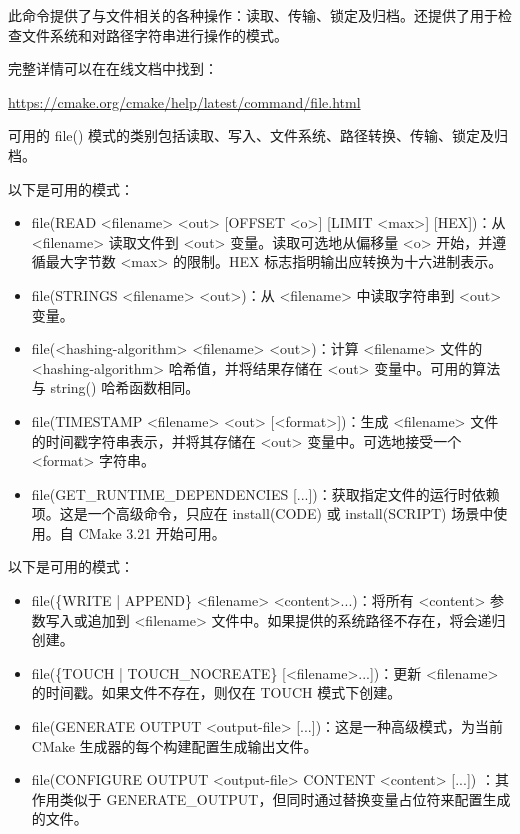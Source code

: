 
此命令提供了与文件相关的各种操作：读取、传输、锁定及归档。还提供了用于检查文件系统和对路径字符串进行操作的模式。

完整详情可以在在线文档中找到：

\url{https://cmake.org/cmake/help/latest/command/file.html}

可用的 file() 模式的类别包括读取、写入、文件系统、路径转换、传输、锁定及归档。


以下是可用的模式：

\begin{itemize}
\item
file(READ <filename> <out> [OFFSET <o>] [LIMIT <max>] [HEX])：从 <filename> 读取文件到 <out> 变量。读取可选地从偏移量 <o> 开始，并遵循最大字节数 <max> 的限制。HEX 标志指明输出应转换为十六进制表示。

\item
file(STRINGS <filename> <out>)：从 <filename> 中读取字符串到 <out> 变量。

\item
file(<hashing-algorithm> <filename> <out>)：计算 <filename> 文件的 <hashing-algorithm> 哈希值，并将结果存储在 <out> 变量中。可用的算法与 string() 哈希函数相同。

\item
file(TIMESTAMP <filename> <out> [<format>])：生成 <filename> 文件的时间戳字符串表示，并将其存储在 <out> 变量中。可选地接受一个 <format> 字符串。

\item
file(GET\_RUNTIME\_DEPENDENCIES [...])：获取指定文件的运行时依赖项。这是一个高级命令，只应在 install(CODE) 或 install(SCRIPT) 场景中使用。自 CMake 3.21 开始可用。
\end{itemize}


以下是可用的模式：

\begin{itemize}
\item
file(\{WRITE | APPEND\} <filename> <content>...)：将所有 <content> 参数写入或追加到 <filename> 文件中。如果提供的系统路径不存在，将会递归创建。

\item
file(\{TOUCH | TOUCH\_NOCREATE\} [<filename>...])：更新 <filename> 的时间戳。如果文件不存在，则仅在 TOUCH 模式下创建。

\item
file(GENERATE OUTPUT <output-file> [...])：这是一种高级模式，为当前 CMake 生成器的每个构建配置生成输出文件。

\item
file(CONFIGURE OUTPUT <output-file> CONTENT <content> [...]) ：其作用类似于 GENERATE\_OUTPUT，但同时通过替换变量占位符来配置生成的文件。
\end{itemize}

